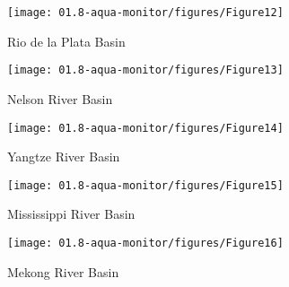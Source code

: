 \begin{figure}
	\centering
	\texttt{[image: 01.8-aqua-monitor/figures/Figure12]}
	\caption{Rio de la Plata Basin}
\end{figure}

\begin{figure}
	\centering
	\texttt{[image: 01.8-aqua-monitor/figures/Figure13]}
	\caption{Nelson River Basin}
\end{figure}

\begin{figure}
	\centering
	\texttt{[image: 01.8-aqua-monitor/figures/Figure14]}
	\caption{Yangtze River Basin}
\end{figure}

\begin{figure}
	\centering
	\texttt{[image: 01.8-aqua-monitor/figures/Figure15]}
	\caption{Mississippi River Basin}
\end{figure}

\begin{figure}
	\centering
	\texttt{[image: 01.8-aqua-monitor/figures/Figure16]}
	\caption{Mekong River Basin}
\end{figure}

